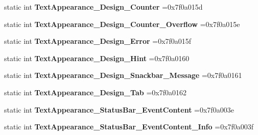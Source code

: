 \begin{DoxyCompactItemize}
static int {\bfseries Text\+Appearance\+\_\+\+Design\+\_\+\+Counter} =0x7f0a015d
\item 
\mbox{\label{classandroid_1_1support_1_1graphics_1_1drawable_1_1R_1_1style_abf7d46bbe036bc77e991c4443cfbc42c}} 
static int {\bfseries Text\+Appearance\+\_\+\+Design\+\_\+\+Counter\+\_\+\+Overflow} =0x7f0a015e
\item 
\mbox{\label{classandroid_1_1support_1_1graphics_1_1drawable_1_1R_1_1style_a9fd33b7aadf1de03290e4964bc8cc4d2}} 
static int {\bfseries Text\+Appearance\+\_\+\+Design\+\_\+\+Error} =0x7f0a015f
\item 
\mbox{\label{classandroid_1_1support_1_1graphics_1_1drawable_1_1R_1_1style_af512a5e306629ce2383b3fbd3d781f4b}} 
static int {\bfseries Text\+Appearance\+\_\+\+Design\+\_\+\+Hint} =0x7f0a0160
\item 
\mbox{\label{classandroid_1_1support_1_1graphics_1_1drawable_1_1R_1_1style_aa7684db539559d27baa6d9ffcce333f0}} 
static int {\bfseries Text\+Appearance\+\_\+\+Design\+\_\+\+Snackbar\+\_\+\+Message} =0x7f0a0161
\item 
\mbox{\label{classandroid_1_1support_1_1graphics_1_1drawable_1_1R_1_1style_aab68691175ce2947a56ba3ef87f3d8b7}} 
static int {\bfseries Text\+Appearance\+\_\+\+Design\+\_\+\+Tab} =0x7f0a0162
\item 
\mbox{\label{classandroid_1_1support_1_1graphics_1_1drawable_1_1R_1_1style_a5b1aae96d208ca588204d91a183528dd}} 
static int {\bfseries Text\+Appearance\+\_\+\+Status\+Bar\+\_\+\+Event\+Content} =0x7f0a003e
\item 
\mbox{\label{classandroid_1_1support_1_1graphics_1_1drawable_1_1R_1_1style_aad63346655d6f67788bbe06638e5e39a}} 
static int {\bfseries Text\+Appearance\+\_\+\+Status\+Bar\+\_\+\+Event\+Content\+\_\+\+Info} =0x7f0a003f
\item 

\end{DoxyCompactItemize}

